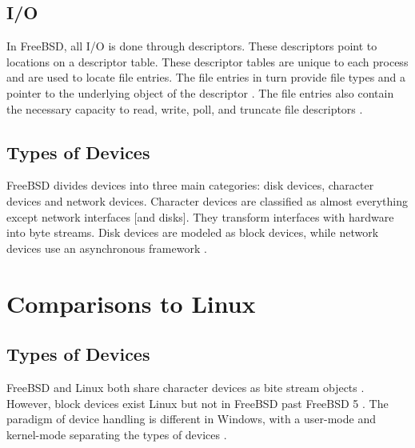 \documentclass[10pt,draftclsnofoot,onecolumn,compsoc]{IEEEtran}
\begin{document}
	\subsection{I/O}
	
	In FreeBSD, all I/O is done through descriptors. These descriptors point to locations on a descriptor table. These descriptor tables are unique to each process and are used to locate file entries. The file entries in turn provide file types and a pointer to the underlying object of the descriptor \cite{BSD}. The file entries also contain the necessary capacity to read, write, poll, and truncate file descriptors \cite{BSD}.
	
	\subsection{Types of Devices}
	
	FreeBSD divides devices into three main categories: disk devices, character devices and network devices. Character devices are classified as almost everything except network interfaces [and disks]. They transform interfaces with hardware into byte streams. Disk devices are modeled as block devices, while network devices use an asynchronous framework \cite{BSD}.
	
	\section{Comparisons to Linux}
	
	\subsection{Types of Devices}
	
	FreeBSD and Linux both share character devices as bite stream objects \cite{BSD} \cite{Kevin}. However, block devices exist Linux \cite{Kevin} but not in FreeBSD past FreeBSD 5 \cite{BSD}. The paradigm of device handling is different in Windows, with a user-mode and kernel-mode separating the types of devices \cite{WInternals}.
		
	

\end{document}
